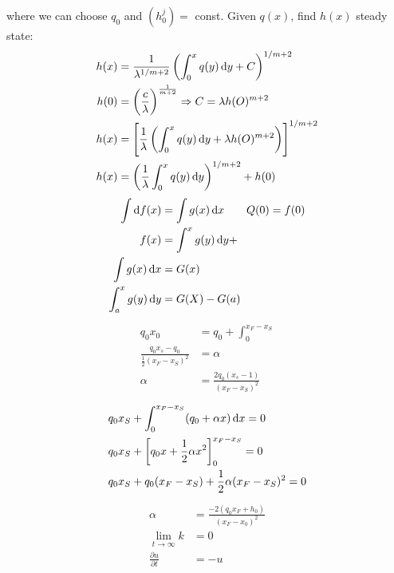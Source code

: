 where we can choose $q_0$ and $\left(h_0^{j}\right) = $ const.
%
Given $q(x)$, find $h(x)$ steady state:
\begin{align*}
    \begin{split}
        h(x) &= \frac{1}{\lambda^{1/m+2}}\left(\int_0^xq(y)\dif{y} +C\right)^{1/m+2} \\
        h(0) &= \left(\frac{c}{\lambda}\right)^\frac{1}{m+2} \Rightarrow C = \lambda h(O)^{m+2} \\
        h(x) &= \left[\frac{1}{\lambda}\left( \int_0^xq(y)\dif{y} +\lambda h(O)^{m+2}\right)\right]^{1/m+2} \\
        h(x) &= \left(\frac{1}{\lambda} \int_0^xq(y)\dif{y} \right)^{1/m+2} + h(0) \\
    \end{split}
\end{align*}
%
%
\begin{align*}
    \begin{split}
        \int \dif f(x) &= \int g(x) \dif{x} \qquad Q(0) = f(0) \\
        f(x) &= \int^x g(y) \dif{y} + \\
        \int g(x) \dif{x} &= G(x) \\
        \int_a^x g(y) \dif{y} &= G(X) - G(a)
    \end{split}
\end{align*}
%
%
\begin{align*}
    \begin{split}
        q_0 x_0 &= q_0 + \int_0^{x_F-x_S} \\
        \frac{q_0 x_s - q_0}{\frac{1}{2}(x_F - x_S)^2} &= \alpha \\
        \alpha &= \frac{2q_0 (x_s - 1)}{(x_F - x_S)^2}
    \end{split}
\end{align*}
%
%
\begin{align*}
    \begin{split}
        & q_0 x_S + \int_0^{x_F - x_S}(q_0 + \alpha x) \dif{x} = 0\\
        & q_0 x_S + \left[q_0 x + \frac{1}{2}\alpha x^2\right]_0^{x_F - x_S} = 0\\
        & q_0 x_S + q_0 (x_F - x_S) + \frac{1}{2}\alpha (x_F - x_S)^2 = 0\\
    \end{split}
\end{align*}
%
%
\begin{align*}
    \begin{split}
        \alpha &= \frac{-2(q_0 x_F + h_0)}{(x_F - x_0)^2} \\
        \lim_{t\rightarrow \infty} k &= 0 \\
        \frac{\partial u}{\partial t} &= -u
    \end{split}
\end{align*}
